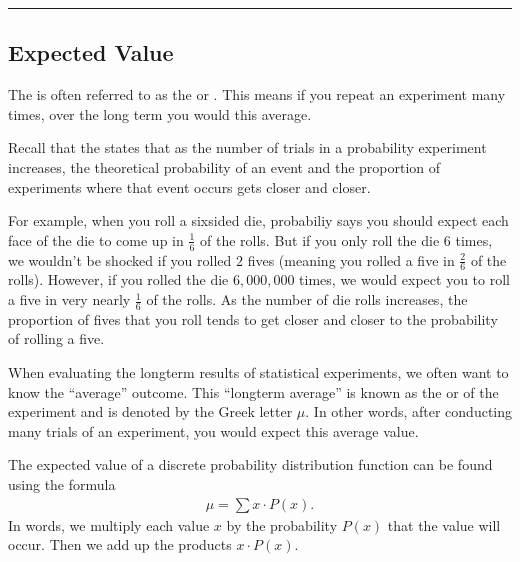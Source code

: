 \documentclass[letterpaper,10pt,english]{jupyterBook}
\begin{document}
\bigskip\hrule\bigskip



\subsection{Expected Value}
\label{\detokenize{Ch3 Probability/3.5 Discrete Probability Distributions:expected-value}}
\sphinxAtStartPar
The  is often referred to as the  or . This means if you repeat an experiment many times, over the long term you would  this average.

\sphinxAtStartPar
Recall that the  states that as the number of trials in a probability experiment increases, the theoretical probability of an event and the proportion of experiments where that event occurs gets closer and closer.

\sphinxAtStartPar
For example, when you roll a six\sphinxhyphen{}sided die, probabiliy says you should expect each face of the die to come up in \(\frac{1}{6}\) of the rolls. But if you only roll the die \(6\) times, we wouldn’t be shocked if you rolled \(2\) fives (meaning you rolled a five in \(\frac{2}{6}\) of the rolls). However, if you rolled the die \(6{,}000{,}000\) times, we would expect you to roll a five in very nearly \(\frac{1}{6}\) of the rolls. As the number of die rolls increases, the proportion of fives that you roll tends to get closer and closer to the probability of rolling a five.

\sphinxAtStartPar
When evaluating the long\sphinxhyphen{}term results of statistical experiments, we often want to know the “average” outcome. This “long\sphinxhyphen{}term average” is known as the  or  of the experiment and is denoted by the Greek letter \(\mu\). In other words, after conducting many trials of an experiment, you would expect this average value.

\sphinxAtStartPar
The expected value of a discrete probability distribution function can be found using the formula
\begin{equation*}
\begin{split} \mu = \sum x \cdot P(x). \end{split}
\end{equation*}
\sphinxAtStartPar
In words, we multiply each value \(x\) by the probability \(P(x)\) that the value will occur. Then we add up the products \(x \cdot P(x)\).
\end{document}
